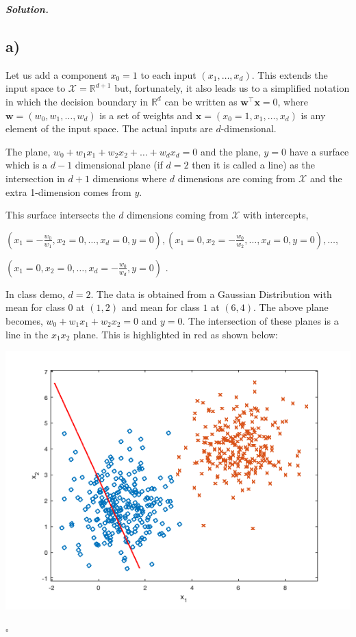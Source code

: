 \documentclass[10pt]{article}
\newenvironment{solution}[1][\it{Solution}]{\textbf{#1. } }{$\square$}
\begin{document}
\begin{solution}

\subsection*{a)}

Let us add a component $x_{0}=1$ to each input $\left(x_{1}, \ldots, x_{d}\right)$. This extends the input space to $\mathcal{X}=\mathbb{R}^{d+1}$ but, fortunately, it also leads us to a simplified notation in which the decision boundary in $\mathbb{R}^{d}$ can be written as $\mathbf{w}^{\top} \mathbf{x}=0$, where $\mathbf{w}=\left(w_{0}, w_{1}, \ldots, w_{d}\right)$ is a set of weights and $\mathbf{x}=\left(x_{0}=1, x_{1}, \ldots, x_{d}\right)$ is any element of the input space. The actual inputs are $d$-dimensional.

The plane, $w_0 + w_1x_1 + w_2x_2 + \ldots + w_dx_d = 0$ and the plane, $y = 0$ have a surface which is a $d - 1$ dimensional plane (if $d = 2$ then it is called a line) as the intersection in $d + 1$ dimensions where $d$ dimensions are coming from $\mathcal{X}$ and the extra 1-dimension comes from $y$.

This surface intersects the $d$ dimensions coming from $\mathcal{X}$ with intercepts,

$\left(x_1=-\frac{w_0}{w_1}, x_2=0, \ldots , x_d = 0, y = 0\right), \left(x_1=0, x_2=-\frac{w_0}{w_2}, \ldots , x_d = 0, y = 0\right), \ldots,$

$ \left(x_1=0, x_2=0, \ldots , x_d = -\frac{w_0}{w_d}, y = 0\right)$ .

In class demo, $d = 2$. The data is obtained from a Gaussian Distribution with mean for class $0$ at $(1, 2)$ and mean for class $1$ at $(6, 4)$. The above plane becomes, $w_0 + w_1x_1 + w_2x_2 = 0$ and $y = 0$. The intersection of these planes is a line in the $x_1x_2$ plane. This is highlighted in red as shown below:

\begin{center}
\includegraphics[width=16cm, keepaspectratio]{Initial_Separation_Line_Class}
\end{center}


\end{solution}
\end{document}
